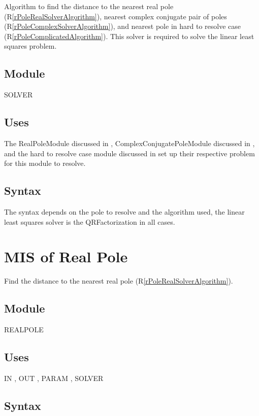 \documentclass[12pt, titlepage]{article}
\newcommand{\rref}[1]{(R\ref{#1})}
\begin{document}
Algorithm to find the distance to the
 nearest real pole \rref{rPoleRealSolverAlgorithm},
 nearest complex conjugate pair of poles \rref{rPoleComplexSolverAlgorithm}, and
 nearest pole in hard to resolve case \rref{rPoleComplicatedAlgorithm}.
This solver is required to solve the linear least squares problem.

\subsection{Module}

SOLVER

\subsection{Uses}

The RealPoleModule discussed in ,
 ComplexConjugatePoleModule discussed in , and
 the hard to resolve case module discussed in 
 set up their respective problem for this module to resolve.

\subsection{Syntax}

The syntax depends on the pole to resolve and the algorithm used, the linear least squares
solver is the QRFactorization in all cases.

\section{MIS of Real Pole} \label{sc:MIS_POLEREALSOLVERMODULE}

Find the distance to the nearest real pole \rref{rPoleRealSolverAlgorithm}.

\subsection{Module}

REALPOLE

\subsection{Uses}

IN , OUT , PARAM , SOLVER 

\subsection{Syntax}
\end{document}
